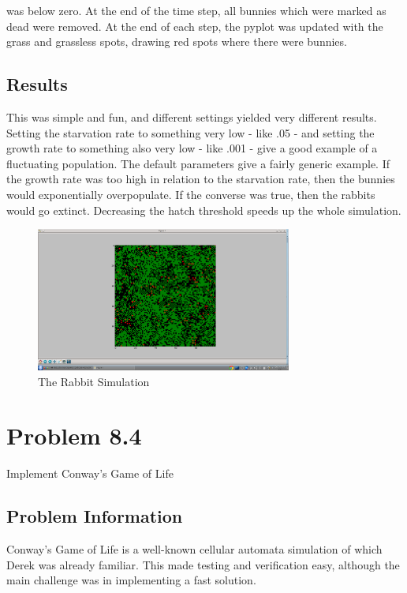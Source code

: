 was below zero.  At the end of the time step, all bunnies which were marked as dead were removed.  At the end of each step, the pyplot was updated with the grass and grassless spots, drawing red spots where there were bunnies.

\subsection{Results}

This was simple and fun, and different settings yielded very different results.  Setting the starvation rate to something very low - like .05 - and setting the growth rate to something also very low - like .001 - give a good example of a fluctuating population.  The default parameters give a fairly generic example.  If the growth rate was too high in relation to the starvation rate, then the bunnies would exponentially overpopulate.  If the converse was
 true, then the rabbits would go extinct.  Decreasing the hatch threshold speeds up the whole simulation.
  

\begin{figure}[tbh]
\begin{center}
\includegraphics[width=0.75\textwidth]{rabbits1.png}
\end{center}
\caption{The Rabbit Simulation\label{fig:gprun}}
\end{figure}



\section{Problem 8.4}

Implement Conway's Game of Life

\subsection{Problem Information}

Conway's Game of Life is a well-known cellular automata simulation of which Derek was already familiar.  This made testing and verification easy, although the main challenge was in implementing a fast solution.  

